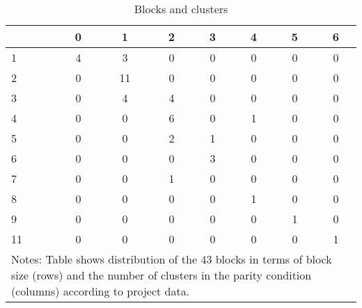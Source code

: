 \begin{table}[h!]
\centering
\caption{Blocks and clusters} 
\label{tab:bins}
\begin{tabular}{l|ccccccc}
  & 0 & 1 & 2 & 3 & 4 & 5 & 6 \\ 
  \hline
\hline
1 &   4 &   3 &   0 &   0 &   0 &   0 &   0 \\ 
  2 &   0 &  11 &   0 &   0 &   0 &   0 &   0 \\ 
  3 &   0 &   4 &   4 &   0 &   0 &   0 &   0 \\ 
  4 &   0 &   0 &   6 &   0 &   1 &   0 &   0 \\ 
  5 &   0 &   0 &   2 &   1 &   0 &   0 &   0 \\ 
  6 &   0 &   0 &   0 &   3 &   0 &   0 &   0 \\ 
  7 &   0 &   0 &   1 &   0 &   0 &   0 &   0 \\ 
  8 &   0 &   0 &   0 &   0 &   1 &   0 &   0 \\ 
  9 &   0 &   0 &   0 &   0 &   0 &   1 &   0 \\ 
  11 &   0 &   0 &   0 &   0 &   0 &   0 &   1 \\ 
   \hline \hline \multicolumn{8}{p{5cm}}{Notes: Table shows distribution of the 43 blocks in terms of block size (rows) and the number of clusters in the parity condition (columns) according to project data.}\end{tabular}
\end{table}

